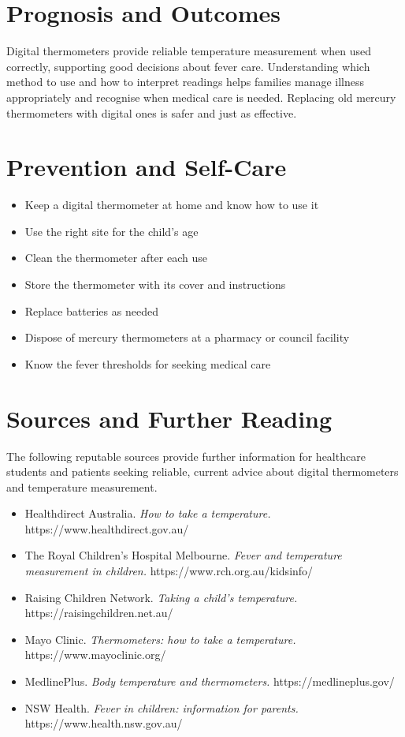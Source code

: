 \section*{Prognosis and Outcomes}
Digital thermometers provide reliable temperature measurement when used correctly, supporting good decisions about fever care. Understanding which method to use and how to interpret readings helps families manage illness appropriately and recognise when medical care is needed. Replacing old mercury thermometers with digital ones is safer and just as effective.

\section*{Prevention and Self-Care}
\begin{itemize}
    \item Keep a digital thermometer at home and know how to use it
    \item Use the right site for the child's age
    \item Clean the thermometer after each use
    \item Store the thermometer with its cover and instructions
    \item Replace batteries as needed
    \item Dispose of mercury thermometers at a pharmacy or council facility
    \item Know the fever thresholds for seeking medical care
\end{itemize}

\section*{Sources and Further Reading}
The following reputable sources provide further information for healthcare students and patients seeking reliable, current advice about digital thermometers and temperature measurement.

\begin{itemize}
    \item Healthdirect Australia. \textit{How to take a temperature.} https://www.healthdirect.gov.au/
    \item The Royal Children's Hospital Melbourne. \textit{Fever and temperature measurement in children.} https://www.rch.org.au/kidsinfo/
    \item Raising Children Network. \textit{Taking a child's temperature.} https://raisingchildren.net.au/
    \item Mayo Clinic. \textit{Thermometers: how to take a temperature.} https://www.mayoclinic.org/
    \item MedlinePlus. \textit{Body temperature and thermometers.} https://medlineplus.gov/
    \item NSW Health. \textit{Fever in children: information for parents.} https://www.health.nsw.gov.au/
\end{itemize}
